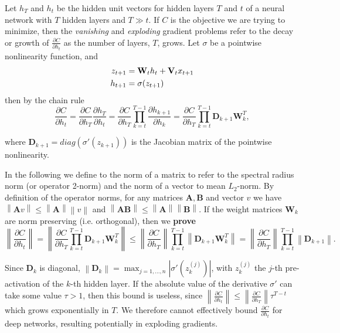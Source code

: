 \documentclass{article} %
\newcommand{\matr}[1]{\mathbf{#1}}
\newcommand\norm[1]{\left\lVert#1\right\rVert}
\begin{document}
Let $h_T$ and $h_t$ be the hidden unit vectors for hidden layers $T$ and $t$ of a neural network with 
$T$ hidden layers and $T \gg t$. 
If $C$ is the objective we are trying to minimize, then the {\it{vanishing}} and {\it{exploding}} 
gradient problems refer to the decay or growth of $\frac{\partial C}{\partial h_t}$ as the 
number of layers, $T$, grows. Let $\sigma$ be a pointwise nonlinearity function, and
\begin{align}
  z_{t+1} &= \matr{W}_t h_t + \matr{V}_t x_{t+1}  \notag \\
  h_{t+1} &= \sigma (z_{t+1})
\label{nonlinoutput}
\end{align}
then by the chain rule
\begin{equation}
  \frac{\partial C}{\partial h_t} = \frac{\partial C}{\partial h_T} \frac{\partial h_T}{\partial h_t} 
  = \frac{\partial C}{\partial h_T} \prod_{k=t}^{T-1} \frac{\partial h_{k+1}}{\partial h_k} 
  = \frac{\partial C}{\partial h_T} \prod_{k=t}^{T-1} \matr{D}_{k+1} \matr{W}_k^T ,
\end{equation}

where $\matr{D}_{k+1} = diag(\sigma'(z_{k+1}))$ is the Jacobian matrix of the pointwise nonlinearity.

In the following we define to the norm of a matrix to refer to the spectral radius norm (or operator 2-norm)
and the norm of a vector to mean $L_2$-norm. By definition of the operator norms, 
for any matrices $\matr{A}, \matr{B}$ and vector $v$ we have $\norm{\matr{A}v} \leq \norm{\matr{A}} \norm{v}$ and $\norm{\matr{A}\matr{B}} \leq \norm{\matr{A}} \norm{\matr{B}}$.
If the weight matrices $\matr{W}_k$ are norm preserving (i.e. orthogonal), then we {\bf{prove}}
\begin{equation}
  \norm{ \frac{\partial C}{\partial h_t} } = \norm{ \frac{\partial C}{\partial h_T} 
  \prod_{k=t}^{T-1} \matr{D}_{k+1} \matr{W}_k^T } \leq \norm{\frac{\partial C}{\partial h_T}} 
  \prod_{k=t}^{T-1} \norm{ \matr{D}_{k+1} \matr{W}_k^T } 
  = \norm{ \frac{\partial C}{\partial h_T}} \prod_{k=t}^{T-1} \norm{\matr{D}_{k+1}} .
\label{bound}
\end{equation}

Since $\matr{D}_k$ is diagonal, $\norm{\matr{D}_k} = \max_{j=1, ..., n} |\sigma'(z_k^{(j)})|$,
with $z_k^{(j)}$ the $j$-th pre-activation of the $k$-th hidden layer.
If the absolute value of the derivative $\sigma'$ can take some value $\tau > 1$, then 
this bound is useless, since $\norm{\frac{\partial C}{\partial h_t}} 
\leq \norm{\frac{\partial C}{\partial h_T}} \tau^{T-t}$ which grows exponentially 
in $T$. We therefore cannot effectively bound $\frac{\partial C}{\partial h_t}$ 
for deep networks, resulting potentially in exploding gradients.
\end{document}
